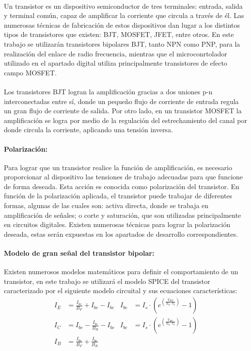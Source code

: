\paragraph{}
Un transistor es un dispositivo semiconductor de tres terminales: entrada, salida y terminal común, capaz de amplificar la corriente que circula a través de él. 
Las numerosas técnicas de fabricación de estos dispositivos dan lugar a los distintos tipos de transistores que existen: BJT, MOSFET, JFET, entre otros.
En este trabajo se utilizarán transistores bipolares BJT, tanto NPN como PNP, para la realización del enlace de radio frecuencia, mientras que el microconrtolador utilizado en el apartado digital utiliza principalmente transistores de efecto campo MOSFET.
\paragraph{}
Los transistores BJT logran la amplificación gracias a dos uniones p-n interconectadas entre sí, donde un pequeño flujo de corriente de entrada regula un gran flujo de corriente de salida. Por otro lado, en un transistor MOSFET la amplificación se logra por medio de la regulación del estrechamiento del canal por donde circula la corriente, aplicando una tensión inversa.
\paragraph{Polarizaci\'on:}
Para lograr que un transistor realice la función de amplificación, es necesario proporcionar al dispositivo las tensiones de trabajo adecuadas para que funcione de forma deseada. Esta acci\'on es conocida como polarizaci\'on del transistor.
En función de la polarización aplicada, el transistor puede trabajar de diferentes formas, algunas de las cuales son: activa directa, donde se trabaja en amplificación de señales; o corte y saturación, que son utilizadas principalmente en circuitos digitales.
Existen numerosas técnicas para lograr la polarización deseada, estas serán expuestas en los apartados de desarrollo correspondientes.

\paragraph{Modelo de gran señal del transistor bipolar:}
Existen numerosos modelos matemáticos para definir el comportamiento de un transistor, en este trabajo se utilizará el modelo SPICE del transistor caracterizado por el siguiente modelo circuital y sus ecuaciones características:
\begin{align*} 
   I_E &= \frac { I_{be} }{ B_F } + I_{be} - I_{bc}   & I_{be} &= I_s \cdot \left(e^{\left(\frac {V_{BE}}{N_{T} \cdot V_t} \right)} - 1\right)\\
   I_C &= I_{be} - \frac{I_{bc}}{B_R} - I_{bc}  & I_{bc} &= I_s \cdot \left(e^{\left(\frac {V_{BC}}{N_{T} \cdot V_t} \right)} - 1\right)\\
   I_B &= \frac{I_{be}}{B_F} + \frac{I_{bc}}{B_R} 
\end{align*}


